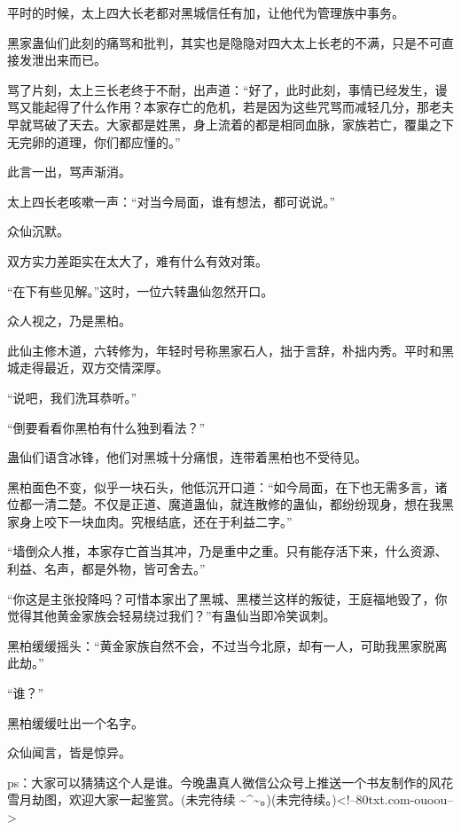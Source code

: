 \begin{this_body}
平时的时候，太上四大长老都对黑城信任有加，让他代为管理族中事务。

黑家蛊仙们此刻的痛骂和批判，其实也是隐隐对四大太上长老的不满，只是不可直接发泄出来而已。

骂了片刻，太上三长老终于不耐，出声道：“好了，此时此刻，事情已经发生，谩骂又能起得了什么作用？本家存亡的危机，若是因为这些咒骂而减轻几分，那老夫早就骂破了天去。大家都是姓黑，身上流着的都是相同血脉，家族若亡，覆巢之下无完卵的道理，你们都应懂的。”

此言一出，骂声渐消。

太上四长老咳嗽一声：“对当今局面，谁有想法，都可说说。”

众仙沉默。

双方实力差距实在太大了，难有什么有效对策。

“在下有些见解。”这时，一位六转蛊仙忽然开口。

众人视之，乃是黑柏。

此仙主修木道，六转修为，年轻时号称黑家石人，拙于言辞，朴拙内秀。平时和黑城走得最近，双方交情深厚。

“说吧，我们洗耳恭听。”

“倒要看看你黑柏有什么独到看法？”

蛊仙们语含冰锋，他们对黑城十分痛恨，连带着黑柏也不受待见。

黑柏面色不变，似乎一块石头，他低沉开口道：“如今局面，在下也无需多言，诸位都一清二楚。不仅是正道、魔道蛊仙，就连散修的蛊仙，都纷纷现身，想在我黑家身上咬下一块血肉。究根结底，还在于利益二字。”

“墙倒众人推，本家存亡首当其冲，乃是重中之重。只有能存活下来，什么资源、利益、名声，都是外物，皆可舍去。”

“你这是主张投降吗？可惜本家出了黑城、黑楼兰这样的叛徒，王庭福地毁了，你觉得其他黄金家族会轻易绕过我们？”有蛊仙当即冷笑讽刺。

黑柏缓缓摇头：“黄金家族自然不会，不过当今北原，却有一人，可助我黑家脱离此劫。”

“谁？”

黑柏缓缓吐出一个名字。

众仙闻言，皆是惊异。

ps：大家可以猜猜这个人是谁。今晚蛊真人微信公众号上推送一个书友制作的风花雪月劫图，欢迎大家一起鉴赏。(未完待续 \~{}\^{}\~{}。)(未完待续。)<!--80txt.com-ouoou-->

\end{this_body}

